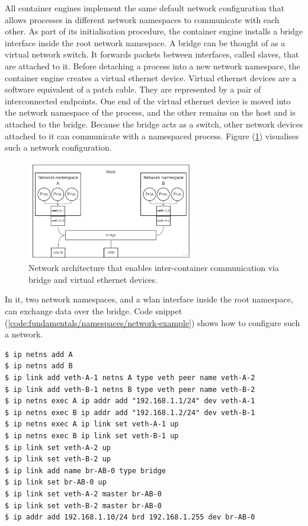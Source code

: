 All container engines implement the same default network configuration that allows processes 
in different network namespaces to communicate with each other. As part of its initialisation procedure,
the container engine installs a bridge interface inside the root network namespace.
A bridge can be thought of as a virtual network switch. 
It forwards packets between interfaces, called slaves, that are attached to it. 
Before detaching a process into a new network namespace, the container engine creates a 
virtual ethernet device. Virtual ethernet devices are a software equivalent of a patch cable. 
They are represented by a pair of interconnected endpoints. One end of the virtual ethernet device is moved 
into the network namespace of the process, and the other remains on the host and is attached 
to the bridge. Because the bridge acts as a switch, other network devices attached 
to it can communicate with a namespaced process. Figure (\ref{images:fundamentals/net-ns-veth-arch.jpg})
visualises such a network configuration.

\begin{figure}[H]
    \centering
    \includegraphics[width=0.65\textwidth]{images/fundamentals/net-ns-veth-arch.jpg}
    \caption{Network architecture that enables inter-container communication via bridge and virtual ethernet devices.}
    \label{images:fundamentals/net-ns-veth-arch.jpg}
\end{figure}

In it, two network namespaces, and a wlan interface
inside the root namespace, can exchange data over the bridge.
Code snippet (\ref{code:fundamentals/namespaces/network-example})
shows how to configure such a network.

\begin{lstlisting}[label={code:fundamentals/namespaces/network-example}, style=bash, caption={Commands for configuring the network as shown in  Figure (\ref{images:fundamentals/net-ns-veth-arch.jpg})}]
$ ip netns add A 
$ ip netns add B 
$ ip link add veth-A-1 netns A type veth peer name veth-A-2
$ ip link add veth-B-1 netns B type veth peer name veth-B-2
$ ip netns exec A ip addr add "192.168.1.1/24" dev veth-A-1 
$ ip netns exec B ip addr add "192.168.1.2/24" dev veth-B-1
$ ip netns exec A ip link set veth-A-1 up 
$ ip netns exec B ip link set veth-B-1 up 
$ ip link set veth-A-2 up 
$ ip link set veth-B-2 up 
$ ip link add name br-AB-0 type bridge 
$ ip link set br-AB-0 up 
$ ip link set veth-A-2 master br-AB-0 
$ ip link set veth-B-2 master br-AB-0 
$ ip addr add 192.168.1.10/24 brd 192.168.1.255 dev br-AB-0
\end{lstlisting}

